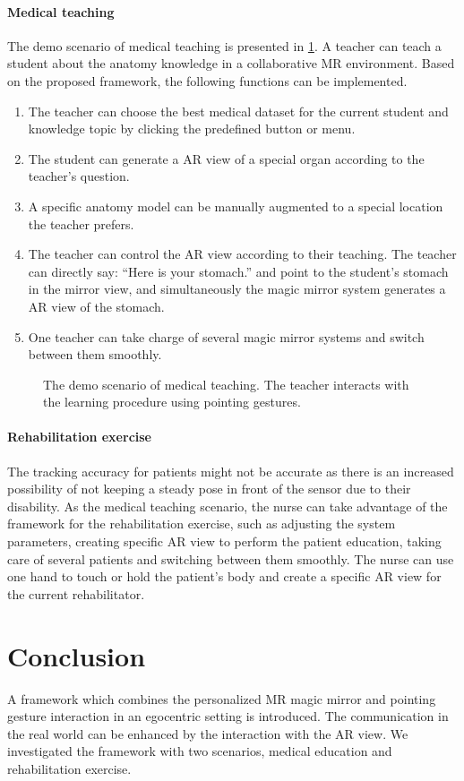 \paragraph{Medical teaching} The demo scenario of medical teaching is presented in \figurename{\ref{fig:5:implementation}}. A teacher can teach a student about the anatomy knowledge in a collaborative MR environment. Based on the proposed framework, the following functions can be implemented. 
\begin{enumerate}
	\item The teacher can choose the best medical dataset for the current student and knowledge topic by clicking the predefined button or menu. 
	\item The student can generate a AR view of a special organ according to the teacher's question.
	\item A specific anatomy model can be manually augmented to a special location the teacher prefers. 
	\item The teacher can control the AR view according to their teaching. The teacher can directly say: ``Here is your stomach.'' and point to the student's stomach in the mirror view, and simultaneously the magic mirror system generates a AR view of the stomach. 
	\item One teacher can take charge of several magic mirror systems and switch between them smoothly.
		
\end{enumerate}
\begin{figure}
	\centering
	\quad
	\caption{The demo scenario of medical teaching. The teacher interacts with the learning procedure using pointing gestures.}
	\label{fig:5:implementation}
\end{figure}
\paragraph{Rehabilitation exercise} The tracking accuracy for patients might not be accurate as there is an increased possibility of not keeping a steady pose in front of the sensor due to their disability. As the medical teaching scenario, the nurse can take advantage of the framework for the rehabilitation exercise, such as adjusting the system parameters, creating specific AR view to perform the patient education, taking care of several patients and switching between them smoothly.
The nurse can use one hand to touch or hold the patient's body and create a specific AR view for the current rehabilitator.

\section{Conclusion}
A framework which combines the personalized MR magic mirror and pointing gesture interaction in an egocentric setting is introduced. The communication in the real world can be enhanced by the interaction with the AR view.
We investigated the framework with two scenarios, medical education and rehabilitation exercise. 